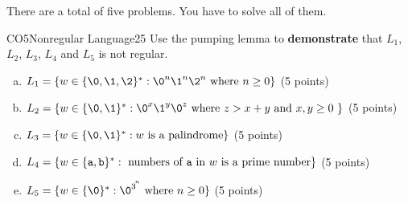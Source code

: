 \documentclass{article}
\begin{document}
\begin{examinstructions}
There are a total of five problems. You have to solve all of them.
\end{examinstructions}



\begin{problem}{1}{CO5}{Nonregular Language}{25}
Use the pumping lemma to \textbf{demonstrate} that \(L_1\), \(L_2\), \(L_3\), \(L_4\) and \(L_5\) is not regular.

\begin{enumerate}[(a)]
\item \( L_1 = \{ w \in \{\0, \1, \2 \}^* :\0^n\1^n\2^n\text{ where } n \geq 0 \} \) (5 points)
\item \( L_2 = \{ w \in \{\0, \1\}^* :\0^x\1^y\0^z\text{ where } z > x+y \text{ and }  x, y \geq 0 \  \} \) (5 points)
\item \( L_3 = \{ w \in \{\0, \1\}^* :w \text{ is a palindrome} \} \) (5 points)
\item \( L_4 = \{ w \in \{\texttt{a}, \texttt{b}\}^* : \text{ numbers of } \texttt{a}\text{ in } w \text{ is a prime number} \} \) (5 points)
\item \( L_5 = \{ w \in \{\0\}^* : {{\0}^3}^{\!^{n}} \text{ where }  n \geq 0 \} \) (5 points)
\end{enumerate}
\end{problem}
\end{document}
